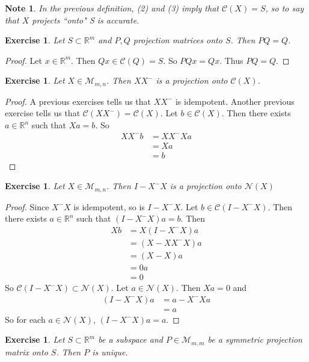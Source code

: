 \documentclass[12pt]{amsart}
\newtheorem{note}[thm]{Note}
\newtheorem{ex}[thm]{Exercise}
\newcommand{\R}{\mathbb{R}}
\newcommand{\MC}{\mathcal{C}}
\newcommand{\MN}{\mathcal{N}}
\newcommand{\MM}{\mathcal{M}}
\newcommand{\z}[1]{Let ${#1} \in \MM_{m,n}$}
\begin{document}
\begin{note}
In the previous definition, (2) and (3) imply that $\MC(X) = S$, so to say that $X$ projects ``onto" S is accurate.
\end{note}

\begin{ex}
Let $S \subset \R^m$ and $P,Q$ projection matrices onto $S$. Then $PQ = Q$. 
\end{ex}

\begin{proof}
Let $x \in \R^m$. Then $Qx \in \MC(Q) = S$. So $PQx = Qx$. Thus $PQ = Q$.
\end{proof}

\begin{ex}
\z{X}. Then $XX^-$ is a projection onto $\MC(X)$.
\end{ex}

\begin{proof}
A previous exercises tells us that $XX^-$ is idempotent. Another previous exercise tells us that $\MC(XX^-) = \MC(X)$. Let $b \in \MC(X)$. Then there exists $a \in \R^n$ such that $Xa =b$. So 
\begin{align*}
XX^-b
&= XX^- Xa\\ 
&= Xa\\
&= b
\end{align*}
\end{proof}

\begin{ex}
\z{X}. Then $I-X^-X$ is a projection onto $\MN(X)$
\end{ex}

\begin{proof}
Since $X^-X$ is idempotent, so is $I-X^-X$. Let $b \in \MC(I-X^-X)$. Then there exists $a \in \R^n$ such that $(I-X^-X)a = b$. Then 
\begin{align*}
Xb 
&= X(I-X^-X)a \\
&= (X-XX^-X)a \\
&= (X-X)a \\
&= 0a \\ 
&= 0
\end{align*}
So $\MC(I-X^-X) \subset \MN(X)$. Let $a \in \MN(X)$. Then $Xa =0$ and 
\begin{align*}
(I-X^-X)a 
&= a - X^-Xa \\
&= a
\end{align*} 
So for each $a \in \MN(X)$, $(I-X^-X)a = a$.
\end{proof}

\begin{ex}
Let $S \subset \R^m$ be a subspace and $P \in \MM_{m,m}$ be a symmetric projection matrix onto $S$. Then $P$ is unique. 
\end{ex}
\end{document}
